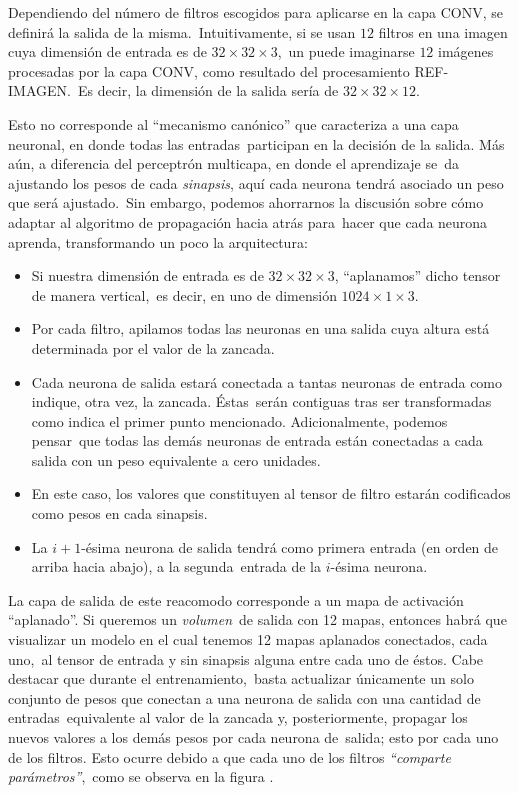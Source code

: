 \noindent
Dependiendo del número de filtros escogidos para aplicarse en la capa CONV, se definirá la salida de la misma.\
Intuitivamente, si se usan $12$ filtros en una imagen cuya dimensión de entrada es de $32 \times 32 \times 3$,\
un puede imaginarse $12$ imágenes procesadas por la capa CONV, como resultado del procesamiento REF-IMAGEN.\
Es decir, la dimensión de la salida sería de $32 \times 32 \times 12$.\par
Esto no corresponde al ``mecanismo canónico'' que caracteriza a una capa neuronal, en donde todas las entradas\
participan en la decisión de la salida. Más aún, a diferencia del perceptrón multicapa, en donde el aprendizaje se\
da ajustando los pesos de cada \emph{sinapsis}, aquí cada neurona tendrá asociado un peso que será ajustado.\
Sin embargo, podemos ahorrarnos la discusión sobre cómo adaptar al algoritmo de propagación hacia atrás para\
hacer que cada neurona aprenda, transformando un poco la arquitectura:
\begin{itemize}
\item Si nuestra dimensión de entrada es de $32 \times 32 \times 3$, ``aplanamos'' dicho tensor de manera vertical,\
  es decir, en uno de dimensión $1024 \times 1 \times 3$.
\item Por cada filtro, apilamos todas las neuronas en una salida cuya altura está determinada por el valor de la zancada.
\item Cada neurona de salida estará conectada a tantas neuronas de entrada como indique, otra vez, la zancada. Éstas\
  serán contiguas tras ser transformadas como indica el primer punto mencionado. Adicionalmente, podemos pensar\
  que todas las demás neuronas de entrada están conectadas a cada salida con un peso equivalente a cero unidades.
\item En este caso, los valores que constituyen al tensor de filtro estarán codificados como pesos en cada sinapsis.
\item La $i+1$-ésima neurona de salida tendrá como primera entrada (en orden de arriba hacia abajo), a la segunda\
  entrada de la $i$-ésima neurona.
\end{itemize}\par
La capa de salida de este reacomodo corresponde a un mapa de activación ``aplanado''. Si queremos un \emph{volumen}\
de salida con 12 mapas, entonces habrá que visualizar un modelo en el cual tenemos 12 mapas aplanados conectados, cada uno,\
al tensor de entrada y sin sinapsis alguna entre cada uno de éstos. Cabe destacar que durante el entrenamiento,\
basta actualizar únicamente un solo conjunto de pesos que conectan a una neurona de salida con una cantidad de entradas\
equivalente al valor de la zancada y, posteriormente, propagar los nuevos valores a los demás pesos por cada neurona de\
salida; esto por cada uno de los filtros. Esto ocurre debido a que cada uno de los filtros \emph{``comparte parámetros''},\
como se observa en la figura \label{fCNN_fig}.

